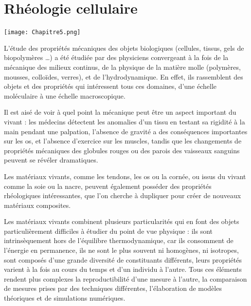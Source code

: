 %
%
%

\chapter{Rhéologie cellulaire}
\begin{center}
\texttt{[image: Chapitre5.png]}

\end{center}
\newpage

L'étude des propriétés mécaniques des objets biologiques (cellules, tissus, gels de biopolymères \dots) a été étudiée par des physiciens convergeant à la fois de la mécanique des milieux continus, de la physique de la matière molle (polymères, mousses, colloïdes, verres), et de l'hydrodynamique. 
En effet, ils rassemblent des objets et des propriétés qui intéressent tous ces domaines, d'une échelle moléculaire à une échelle macroscopique. 

Il est aisé de voir à quel point la mécanique peut être un aspect important du vivant : les médecins détectent les anomalies d'un tissu en testant sa rigidité \og à la main \fg pendant une palpation, l'absence de gravité a des conséquences importantes sur les os, et l'absence d'exercice sur les muscles, tandis que les changements de propriétés mécaniques des globules rouges ou des parois des vaisseaux sanguins peuvent se révéler dramatiques. 

Les matériaux vivants, comme les tendons, les os ou la cornée, ou issus du vivant comme la soie ou la nacre, peuvent également posséder des propriétés rhéologiques intéressantes, que l'on cherche à dupliquer pour créer de nouveaux matériaux composites. 

Les matériaux vivants combinent plusieurs particularités qui en font des objets particulièrement difficiles à étudier du point de vue physique : ils sont intrinsèquement hors de l'équilibre thermodynamique, car ils consomment de l'énergie en permanence, ils ne sont le plus souvent ni homogènes, ni isotropes, sont composés d'une grande diversité de constituants différents, leurs propriétés varient à la fois au cours du temps et d'un individu à l'autre. 
Tous ces éléments rendent plus complexes la reproductibilité d'une mesure à l'autre, la comparaison de mesures prises par des techniques différentes, l'élaboration de modèles théoriques et de simulations numériques.



